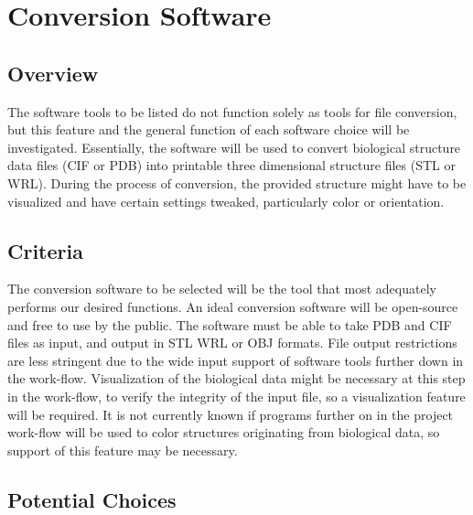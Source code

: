 \documentclass[letterpaper, onecolumn, draftclsnofoot, 10pt, compsoc]{IEEEtran}
\begin{document}
\section{Conversion Software}
        \subsection{Overview}
                \begin{singlespace}
                The software tools to be listed do not function solely as tools for file conversion, but this feature and the general function of each software choice will be investigated.
                Essentially, the software will be used to convert biological structure data files (CIF or PDB) into printable three dimensional structure files (STL or WRL).
                During the process of conversion, the provided structure might have to be visualized and have certain settings tweaked, particularly color or orientation.
                \end{singlespace}
        \subsection{Criteria}
                \begin{singlespace}
                The conversion software to be selected will be the tool that most adequately performs our desired functions.
                An ideal conversion software will be open-source and free to use by the public.
                The software must be able to take PDB and CIF files as input, and output in STL WRL or OBJ formats.
                File output restrictions are less stringent due to the wide input support of software tools further down in the work-flow.
                Visualization of the biological data might be necessary at this step in the work-flow, to verify the integrity of the input file, so a visualization feature will be required.
                It is not currently known if programs further on in the project work-flow will be used to color structures originating from biological data, so support of this feature may be necessary.
                \end{singlespace}
        \subsection{Potential Choices}
\end{document}
